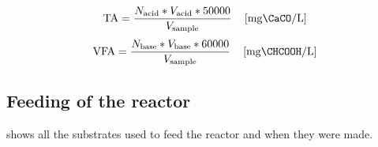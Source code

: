 \begin{equation}
    \mathrm{TA} = \frac{N_\text{acid} * V_\text{acid} * 50000}{V_\text{sample}} \quad \left[\unit{\milli\gram\CaCO\per\litre}\right]
    \label{eq:TA}
\end{equation}
\begin{equation}
    \mathrm{VFA} = \frac{N_\text{base} * V_\text{base} * 60000}{V_\text{sample}} \quad \left[\unit{\milli\gram\CHCOOH\per\litre}\right]
    \label{eq:VFA}
\end{equation}

\subsection{Feeding of the reactor}
\label{subsec:feed_reac}

 shows all the substrates used to feed the reactor and when they were made.

